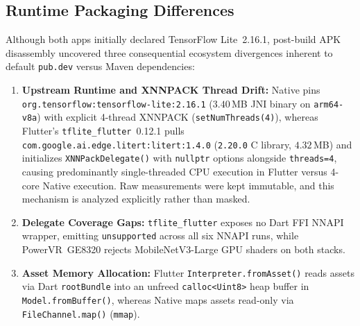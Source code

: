 \subsection{Runtime Packaging Differences}\label{subsec:packaging}
Although both apps initially declared TensorFlow Lite~2.16.1, post-build APK disassembly uncovered three consequential ecosystem divergences inherent to default \texttt{pub.dev} versus Maven dependencies:
\begin{enumerate}
    \item \textbf{Upstream Runtime and XNNPACK Thread Drift:} Native pins \texttt{org.tensorflow:\allowbreak tensorflow-lite:2.16.1} ($3.40$\,MB JNI binary on \texttt{arm64-v8a}) with explicit 4-thread XNNPACK (\texttt{setNumThreads(4)}), whereas Flutter's \texttt{tflite\_flutter}~0.12.1 pulls \texttt{com.google.ai.edge.litert:\allowbreak litert:1.4.0} (\texttt{2.20.0} C library, $4.32$\,MB) and initializes \texttt{XNNPackDelegate()} with \texttt{nullptr} options alongside \texttt{threads=4}, causing predominantly single-threaded CPU execution in Flutter versus 4-core Native execution. Raw measurements were kept immutable, and this mechanism is analyzed explicitly rather than masked.
    \item \textbf{Delegate Coverage Gaps:} \texttt{tflite\_flutter} exposes no Dart FFI NNAPI wrapper, emitting \texttt{unsupported} across all six NNAPI runs, while PowerVR~GE8320 rejects MobileNetV3-Large GPU shaders on both stacks.
    \item \textbf{Asset Memory Allocation:} Flutter \texttt{Interpreter.fromAsset()} reads assets via Dart \texttt{rootBundle} into an unfreed \texttt{calloc<Uint8>} heap buffer in \texttt{Model.fromBuffer()}, whereas Native maps assets read-only via \texttt{FileChannel.map()} (\texttt{mmap}).
\end{enumerate}

